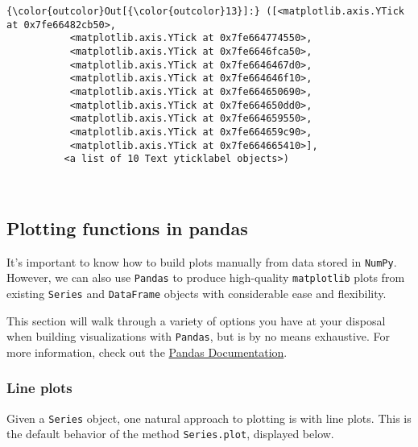 \documentclass{article}
\begin{document}
            \begin{Verbatim}[commandchars=\\\{\}]
{\color{outcolor}Out[{\color{outcolor}13}]:} ([<matplotlib.axis.YTick at 0x7fe66482cb50>,
           <matplotlib.axis.YTick at 0x7fe664774550>,
           <matplotlib.axis.YTick at 0x7fe6646fca50>,
           <matplotlib.axis.YTick at 0x7fe6646467d0>,
           <matplotlib.axis.YTick at 0x7fe664646f10>,
           <matplotlib.axis.YTick at 0x7fe664650690>,
           <matplotlib.axis.YTick at 0x7fe664650dd0>,
           <matplotlib.axis.YTick at 0x7fe664659550>,
           <matplotlib.axis.YTick at 0x7fe664659c90>,
           <matplotlib.axis.YTick at 0x7fe664665410>],
          <a list of 10 Text yticklabel objects>)
\end{Verbatim}
        
    \begin{center}
    \end{center}
    { \hspace*{\fill} \\}
    
    \subsection{Plotting functions in
pandas}\label{plotting-functions-in-pandas}

    It's important to know how to build plots manually from data stored in
\texttt{NumPy}. However, we can also use \texttt{Pandas} to produce
high-quality \texttt{matplotlib} plots from existing \texttt{Series} and
\texttt{DataFrame} objects with considerable ease and flexibility.

This section will walk through a variety of options you have at your
disposal when building visualizations with \texttt{Pandas}, but is by no
means exhaustive. For more information, check out the
\href{http://pandas.pydata.org/pandas-docs/stable/}{Pandas
Documentation}.

    \subsubsection{Line plots}\label{line-plots}

    Given a \texttt{Series} object, one natural approach to plotting is with
line plots. This is the default behavior of the method
\texttt{Series.plot}, displayed below.
\end{document}
